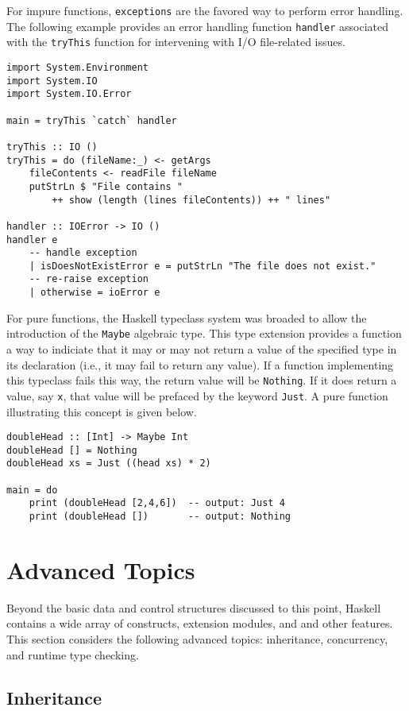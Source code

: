 \documentclass[titlepage,12pt]{article}
\begin{document}
For impure functions, \texttt{exceptions} are the favored way to perform error handling.
The following example provides an error handling function \texttt{handler} associated with the
\texttt{tryThis} function for intervening with I/O file-related issues.
\begin{verbatim}
import System.Environment  
import System.IO  
import System.IO.Error  
      
main = tryThis `catch` handler  
                  
tryThis :: IO ()  
tryThis = do (fileName:_) <- getArgs  
    fileContents <- readFile fileName  
    putStrLn $ "File contains " 
        ++ show (length (lines fileContents)) ++ " lines"  
      
handler :: IOError -> IO ()  
handler e 
    -- handle exception
    | isDoesNotExistError e = putStrLn "The file does not exist."  
    -- re-raise exception
    | otherwise = ioError e  
\end{verbatim}

For pure functions, the Haskell typeclass system was broaded to allow the introduction
of the \texttt{Maybe} algebraic type.  This type extension provides a function a way to
indiciate that it may or may not return a value of the specified type in its declaration
(i.e., it may fail to return any value).  If a function implementing this typeclass
fails this way, the return value will be \texttt{Nothing}.  If it does return a value, say \texttt{x},
that value will be prefaced by the keyword \texttt{Just}.  A pure function illustrating this concept
is given below.
\begin{verbatim}
doubleHead :: [Int] -> Maybe Int
doubleHead [] = Nothing
doubleHead xs = Just ((head xs) * 2)

main = do
    print (doubleHead [2,4,6])  -- output: Just 4
    print (doubleHead [])       -- output: Nothing
\end{verbatim}


\section{Advanced Topics}
Beyond the basic data and control structures discussed to this point,
Haskell contains a wide array of constructs, extension modules, and
and other features.  This section considers the following advanced
topics: inheritance, concurrency, and runtime type checking.

\subsection{Inheritance}
\end{document}
